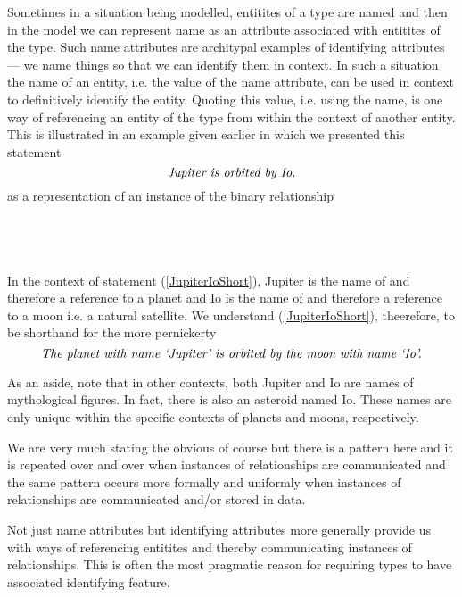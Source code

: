 \mynote
Sometimes in a situation being modelled, entitites of a type are named and then in the model
we can represent name as an attribute associated with entitites of the type.  
Such name attributes are architypal examples of identifying attributes --- we name things so that we can identify them in context. In such a situation the name of an entity, i.e. the value of the name attribute,  can be used in context to definitively identify the entity.
Quoting this value, i.e. using the name, is one way of referencing an entity of the type from within the context of another entity. This is illustrated in  an example given earlier in which we presented this statement
\begin{equation}
\label{JupiterIoShort}
\mbox{\textit{Jupiter is orbited by Io.}}
\end{equation}
as a representation of an instance of the binary relationship
\begin{gather}
\label{planetMoon}
\raisebox{-1cm}{

}
\end{gather}

In the context of statement (\ref{JupiterIoShort}), Jupiter is the name of and therefore  a reference to a planet and  Io is the name of and therefore a reference to a moon i.e. a natural satellite.  
We understand  (\ref{JupiterIoShort}), theerefore, to be shorthand for the 
more pernickerty 
\begin{equation}
\mbox{\textit{The planet with name `Jupiter' is orbited by the moon with name `Io'.}}
\end{equation}

As an aside, note that in other contexts, both Jupiter and Io are names of mythological figures. In fact, there is also an asteroid named Io. These names are only unique within the specific contexts of planets and moons, respectively.

\mynote
We are very much stating the obvious of course but there is a pattern here and it is repeated over and over when instances of relationships are communicated  and the same pattern occurs more formally  and uniformly when instances of relationships are communicated and/or stored in data.

\mynote
 Not just name attributes but identifying attributes more generally provide us with ways of 
 referencing entitites and thereby communicating instances of relationships. 
 This is often the most pragmatic reason for requiring types to have associated identifying feature. 

